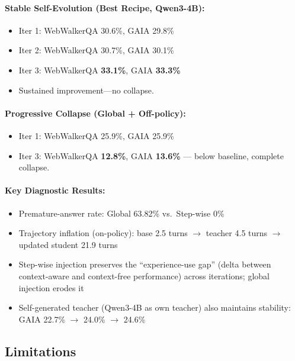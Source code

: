\documentclass[11pt,a4paper]{article}
\begin{document}
\paragraph{Stable Self-Evolution (Best Recipe, Qwen3-4B):}
\begin{itemize}
\item Iter 1: WebWalkerQA 30.6\%, GAIA 29.8\%
\item Iter 2: WebWalkerQA 30.7\%, GAIA 30.1\%
\item Iter 3: WebWalkerQA \textbf{33.1\%}, GAIA \textbf{33.3\%}
\item Sustained improvement---no collapse.
\end{itemize}

\paragraph{Progressive Collapse (Global + Off-policy):}
\begin{itemize}
\item Iter 1: WebWalkerQA 25.9\%, GAIA 25.9\%
\item Iter 3: WebWalkerQA \textbf{12.8\%}, GAIA \textbf{13.6\%} --- below baseline, complete collapse.
\end{itemize}

\paragraph{Key Diagnostic Results:}
\begin{itemize}
\item Premature-answer rate: Global 63.82\% vs.\ Step-wise 0\%
\item Trajectory inflation (on-policy): base 2.5 turns $\to$ teacher 4.5 turns $\to$ updated student 21.9 turns
\item Step-wise injection preserves the ``experience-use gap'' (delta between context-aware and context-free performance) across iterations; global injection erodes it
\item Self-generated teacher (Qwen3-4B as own teacher) also maintains stability: GAIA 22.7\% $\to$ 24.0\% $\to$ 24.6\%
\end{itemize}

\subsection{Limitations}
\end{document}
